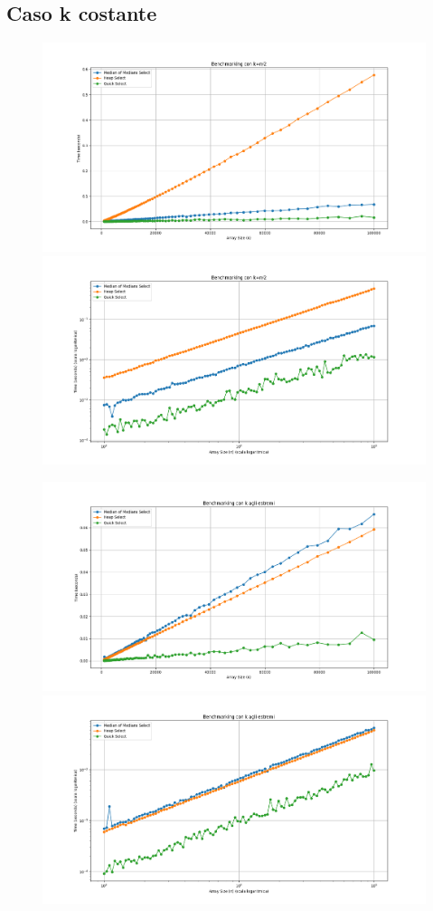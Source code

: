 \documentclass[a4paper]{article}
\begin{document}
\subsection{Caso k costante}
\begin{figure}[h]
            \centering
            \includegraphics[width=.83\textwidth]{graphs/K_const_n.png}
            \includegraphics[width=.83\textwidth]{graphs/K_const_2xlog.png}
\end{figure}
\newpage
\begin{figure}[h]
            \centering
            \includegraphics[width=.83\textwidth]{graphs/K_last_n.png}
            \includegraphics[width=.83\textwidth]{graphs/K_last_2xlog.png}
\end{figure}
\newpage
\end{document}
